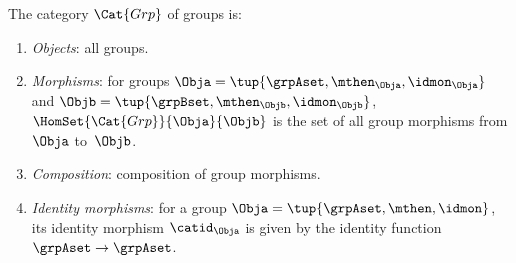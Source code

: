 \begin{ctdefinition}
    \label{def:Grp}
    The category $\Cat{Grp}$ of groups is:
    \begin{enumerate}
        \item \emph{Objects}: all groups.
        \item \emph{Morphisms}: for groups $\Obja = \tup{\grpAset, \mthen_\Obja, \idmon_\Obja}$ and $\Objb = \tup{\grpBset, \mthen_\Objb, \idmon_\Objb}$,  \linebreak $\HomSet{\Cat{Grp}}{\Obja}{\Objb}$ is the set of all group morphisms from $\Obja$ to~$\Objb$.
        \item \emph{Composition}: composition of group morphisms.
        \item \emph{Identity morphisms}: for a group $\Obja = \tup{\grpAset, \mthen, \idmon}$, its identity morphism $\catid_\Obja$ is given by the identity function $\grpAset \to \grpAset$.
    \end{enumerate}
\end{ctdefinition}